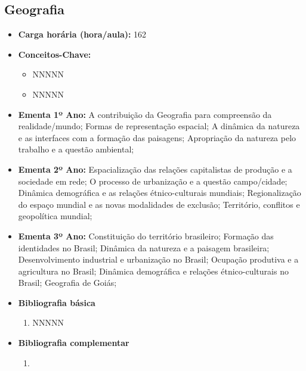 \documentclass[11pt,fleqn]{book} %
\begin{document}
\subsection{Geografia}\label{disc:geografia}
\begin{itemize}
	\item \textbf{Carga horária (hora/aula):} 162
	\item \textbf{Conceitos-Chave:}
	\begin{itemize}
		\item NNNNN
		\item NNNNN
	\end{itemize}
	\item \textbf{Ementa 1º Ano:} 
	A contribuição da Geografia para compreensão da realidade/mundo;
	Formas de representação espacial;
	A dinâmica da natureza e as interfaces com a formação das paisagens;
	Apropriação da natureza pelo trabalho e a questão ambiental;
	\item \textbf{Ementa 2º Ano:} 	
	Espacialização das relações capitalistas de produção e a sociedade em rede;
	O processo de urbanização e a questão campo/cidade;
	Dinâmica demográfica e as relações étnico-culturais mundiais;
	Regionalização do espaço mundial e as novas modalidades de exclusão;
	Território, conflitos e geopolítica mundial;
	\item \textbf{Ementa 3º Ano:} 	
	Constituição do território brasileiro;
	Formação das identidades no Brasil; 
	Dinâmica da natureza e a paisagem brasileira;
	Desenvolvimento industrial e urbanização no Brasil;
	Ocupação produtiva e a agricultura no Brasil; 
	Dinâmica demográfica e relações étnico-culturais no Brasil;
	Geografia de Goiás;
	\item \textbf{Bibliografia básica}
	\begin{enumerate}
		\item NNNNN
	\end{enumerate}
	\item \textbf{Bibliografia complementar}
	\begin{enumerate}
		\item 
	\end{enumerate}	
\end{itemize}

\newpage
\end{document}
